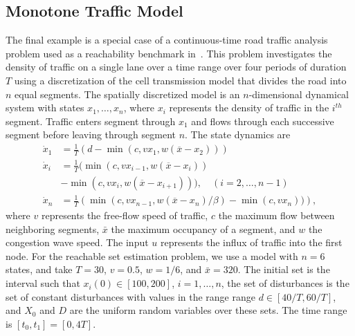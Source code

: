 \documentclass[letterpaper, 10 pt, conference]{ieeeconf}
\begin{document}
\subsection{Monotone Traffic Model}

%
%
%
%
%
%
%

The final example is a special case of a continuous-time road traffic analysis problem
used as a reachability benchmark in~\cite{coogan2018benchmark,meyer2019tira,devonport2020pirk}. This problem
investigates the density of traffic on a single lane over a time range over four 
%
periods of duration $T$ using a 
discretization of the cell transmission model that divides the road into $n$
equal segments. The spatially discretized model
is an $n$-dimensional dynamical system with states $x_1,\dotsc,x_n$, where $x_i$ represents the
density of traffic in the $i^{th}$ segment.
Traffic enters segment through $x_1$ and flows through each successive segment before leaving through
segment $n$.
The state dynamics are
\begin{equation}
\begin{split}
    \label{eq:traffic_dynamics}
    \dot{x}_1 &= \frac{1}{T}\left(d-\min(c, vx_{1}, w(\overline{x}-x_{2}))\right)\\
    \dot{x}_i &= \frac{1}{T}\big( \min(c, vx_{i-1}, w(\overline{x}-x_{i})) \\
              &- \min(c, vx_{i}, w(\overline{x}-x_{i+1}))\big), \quad(i=2,\dotsc,n-1)\\
    \dot{x}_{n} &= \frac{1}{T}\left(\min(c, vx_{n-1}, w(\overline{x}-x_{n})/\beta) - \min(c, vx_{n}))\right),
\end{split}
\end{equation}
where $v$ represents the free-flow speed of
traffic, $c$ the maximum flow between neighboring
segments, $\bar{x}$ the maximum occupancy of a segment, and $w$ the congestion
wave speed. The input $u$ represents the influx of traffic into the first node.
For the reachable set estimation problem, we use a model with $n=6$ states, and take $T=30$, $v=0.5$, $w=1/6$, and $\bar{x}=320$. The initial set is the
interval such that $x_i(0)\in[100,200]$, $i=1,\dotsc,n$, the set of
disturbances is the set of constant disturbances with values in the range range $d\in[40/T, 60/T]$, and $X_0$ and $D$ are the uniform random variables over these sets. The time range is $[t_0, t_1]=[0, 4T]$.
\end{document}
